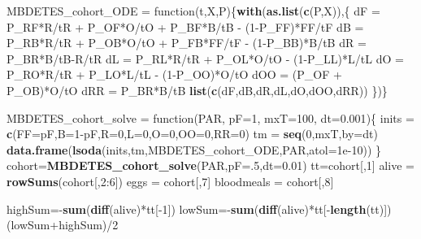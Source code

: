 \documentclass[]{article}
\newenvironment{Shaded}{\begin{snugshade}}{\end{snugshade}}
\newcommand{\KeywordTok}[1]{\textcolor[rgb]{0.13,0.29,0.53}{\textbf{{#1}}}}
\newcommand{\DataTypeTok}[1]{\textcolor[rgb]{0.13,0.29,0.53}{{#1}}}
\newcommand{\DecValTok}[1]{\textcolor[rgb]{0.00,0.00,0.81}{{#1}}}
\newcommand{\FloatTok}[1]{\textcolor[rgb]{0.00,0.00,0.81}{{#1}}}
\newcommand{\StringTok}[1]{\textcolor[rgb]{0.31,0.60,0.02}{{#1}}}
\newcommand{\NormalTok}[1]{{#1}}
\begin{document}
\begin{Shaded}
\begin{Highlighting}[]
\NormalTok{MBDETES_cohort_ODE =}\StringTok{ }\NormalTok{function(t,X,P)\{}\KeywordTok{with}\NormalTok{(}\KeywordTok{as.list}\NormalTok{(}\KeywordTok{c}\NormalTok{(P,X)),\{}
  \NormalTok{dF =}\StringTok{ }\NormalTok{P_RF*R/tR +}\StringTok{ }\NormalTok{P_OF*O/tO +}\StringTok{ }\NormalTok{P_BF*B/tB -}\StringTok{ }\NormalTok{(}\DecValTok{1}\NormalTok{-P_FF)*FF/tF}
  \NormalTok{dB =}\StringTok{ }\NormalTok{P_RB*R/tR +}\StringTok{ }\NormalTok{P_OB*O/tO +}\StringTok{ }\NormalTok{P_FB*FF/tF -}\StringTok{ }\NormalTok{(}\DecValTok{1}\NormalTok{-P_BB)*B/tB}
  \NormalTok{dR =}\StringTok{ }\NormalTok{P_BR*B/tB-R/tR}
  \NormalTok{dL =}\StringTok{ }\NormalTok{P_RL*R/tR +}\StringTok{ }\NormalTok{P_OL*O/tO -}\StringTok{ }\NormalTok{(}\DecValTok{1}\NormalTok{-P_LL)*L/tL}
  \NormalTok{dO =}\StringTok{ }\NormalTok{P_RO*R/tR +}\StringTok{ }\NormalTok{P_LO*L/tL -}\StringTok{ }\NormalTok{(}\DecValTok{1}\NormalTok{-P_OO)*O/tO}
  \NormalTok{dOO =}\StringTok{ }\NormalTok{(P_OF +}\StringTok{ }\NormalTok{P_OB)*O/tO}
  \NormalTok{dRR =}\StringTok{ }\NormalTok{P_BR*B/tB }
  \KeywordTok{list}\NormalTok{(}\KeywordTok{c}\NormalTok{(dF,dB,dR,dL,dO,dOO,dRR))}
\NormalTok{\})\}}

\NormalTok{MBDETES_cohort_solve =}\StringTok{ }\NormalTok{function(PAR, }\DataTypeTok{pF=}\DecValTok{1}\NormalTok{, }\DataTypeTok{mxT=}\DecValTok{100}\NormalTok{, }\DataTypeTok{dt=}\FloatTok{0.001}\NormalTok{)\{}
  \NormalTok{inits =}\StringTok{ }\KeywordTok{c}\NormalTok{(}\DataTypeTok{FF=}\NormalTok{pF,}\DataTypeTok{B=}\DecValTok{1}\NormalTok{-pF,}\DataTypeTok{R=}\DecValTok{0}\NormalTok{,}\DataTypeTok{L=}\DecValTok{0}\NormalTok{,}\DataTypeTok{O=}\DecValTok{0}\NormalTok{,}\DataTypeTok{OO=}\DecValTok{0}\NormalTok{,}\DataTypeTok{RR=}\DecValTok{0}\NormalTok{)}
  \NormalTok{tm =}\StringTok{ }\KeywordTok{seq}\NormalTok{(}\DecValTok{0}\NormalTok{,mxT,}\DataTypeTok{by=}\NormalTok{dt)}
  \KeywordTok{data.frame}\NormalTok{(}\KeywordTok{lsoda}\NormalTok{(inits,tm,MBDETES_cohort_ODE,PAR,}\DataTypeTok{atol=}\FloatTok{1e-10}\NormalTok{))}
\NormalTok{\}}
\NormalTok{cohort=}\KeywordTok{MBDETES_cohort_solve}\NormalTok{(PAR,}\DataTypeTok{pF=}\NormalTok{.}\DecValTok{5}\NormalTok{,}\DataTypeTok{dt=}\FloatTok{0.01}\NormalTok{)}
\NormalTok{tt=cohort[,}\DecValTok{1}\NormalTok{]}
\NormalTok{alive =}\StringTok{ }\KeywordTok{rowSums}\NormalTok{(cohort[,}\DecValTok{2}\NormalTok{:}\DecValTok{6}\NormalTok{])}
\NormalTok{eggs =}\StringTok{ }\NormalTok{cohort[,}\DecValTok{7}\NormalTok{]}
\NormalTok{bloodmeals =}\StringTok{ }\NormalTok{cohort[,}\DecValTok{8}\NormalTok{]}

\NormalTok{highSum=-}\KeywordTok{sum}\NormalTok{(}\KeywordTok{diff}\NormalTok{(alive)*tt[-}\DecValTok{1}\NormalTok{])}
\NormalTok{lowSum=-}\KeywordTok{sum}\NormalTok{(}\KeywordTok{diff}\NormalTok{(alive)*tt[-}\KeywordTok{length}\NormalTok{(tt)])}
\NormalTok{(lowSum+highSum)/}\DecValTok{2}
\end{Highlighting}
\end{Shaded}
\end{document}
